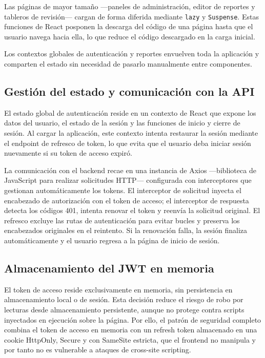 Las páginas de mayor tamaño —paneles de administración, editor de reportes y tableros de revisión— cargan de forma diferida mediante \texttt{lazy} y \texttt{Suspense}. 
Estas funciones de React posponen la descarga del código de una página hasta que el usuario navega hacia ella, lo que reduce el código descargado en la carga inicial.

Los contextos globales de autenticación y reportes envuelven toda la aplicación y comparten el estado sin necesidad de pasarlo manualmente entre componentes.

\subsection{Gestión del estado y comunicación con la API}

El estado global de autenticación reside en un contexto de React que expone los datos del usuario, el estado de la sesión y las funciones de inicio y cierre de sesión. Al cargar la aplicación, este contexto intenta restaurar la sesión mediante el endpoint de refresco de token, lo que evita que el usuario deba iniciar sesión nuevamente si su token de acceso expiró.

La comunicación con el backend recae en una instancia de Axios —biblioteca de JavaScript para realizar solicitudes HTTP— configurada con interceptores que gestionan automáticamente los tokens. 
El interceptor de solicitud inyecta el encabezado de autorización con el token de acceso; el interceptor de respuesta detecta los códigos 401, intenta renovar el token y reenvía la solicitud original. El refresco excluye las rutas de autenticación para evitar bucles y preserva los encabezados originales en el reintento. 
Si la renovación falla, la sesión finaliza automáticamente y el usuario regresa a la página de inicio de sesión.

\subsection{Almacenamiento del JWT en memoria}

El token de acceso reside exclusivamente en memoria, sin persistencia en almacenamiento local o de sesión. 
Esta decisión reduce el riesgo de robo por lecturas desde almacenamiento persistente, aunque no protege contra scripts inyectados en ejecución sobre la página.
Por ello, el patrón de seguridad completo combina el token de acceso en memoria con un refresh token almacenado en una cookie HttpOnly, Secure y con SameSite estricta, que el frontend no manipula y por tanto no es vulnerable a ataques de cross-site scripting.

